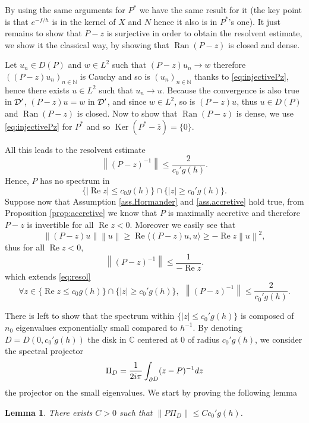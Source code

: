 \documentclass[12pt]{amsart}
\renewcommand{\Re}{\operatorname{Re}}
\newcommand{\C}{\mathbb C}
\newcommand{\N}{\mathbb N}
\newcommand{\Ran}{\operatorname{Ran}}
\newcommand{\Ker}{\operatorname{Ker}}
\def\<{\langle}
\def\>{\rangle}
\numberwithin{equation}{section}
\numberwithin{figure}{section}
\DeclareMathOperator{\p}{\partial}
\newcommand{\vvert}[1]{\left\lVert#1\right\rVert}
\newtheorem{lemma}[defin]{Lemma}
\begin{document}
By using the same arguments for $P^*$ we have the same result for it (the key point is that $e^{-f/h}$ is in the kernel of $X$ and $N$ hence it also is in $P^*$'s one). It just remains to show that $P-z$ is surjective in order to obtain the resolvent estimate, we show it the classical way, by showing that $\Ran(P-z)$ is closed and dense.

Let $u_n\in D(P)$ and $w\in L^2$ such that $(P-z)u_n\to w$ therefore $((P-z)u_n)_{n\in\N}$ is Cauchy and so is $(u_n)_{n\in\N}$ thanks to \eqref{eq:injectivePz}, hence there exists $u\in L^2$ such that $u_n\to u$. Because the convergence is also true in ${\mathcal D}'$, $(P-z)u = w$ in ${\mathcal D}'$, and since $w\in L^2$, so is $(P-z)u$, thus $u\in D(P)$ and $\Ran(P-z)$ is closed. Now to show that $\Ran(P-z)$ is dense, we use \eqref{eq:injectivePz} for $P^*$ and so $\Ker(P^*-\overline{z})=\{0\}$.

All this leads to the resolvent estimate
\begin{equation}\label{eq:resol}
\vvert{(P-z)^{-1}}\leq\frac{2}{c_0'g(h)}.
\end{equation}
Hence, $P$ has no spectrum in
\begin{equation*}
\{|\Re z|\leq c_0g(h)\}\cap\{|z|\geq c_0'g(h)\}.
\end{equation*}
Suppose now that Assumption \ref{ass.Hormander} and \ref{ass.accretive} hold true, from Proposition \ref{prop:accretive} we know that $P$ is maximally accretive and therefore $P - z$ is invertible for all $\Re z < 0$. Moreover we easily see that
\begin{equation*}
\vvert{(P-z)u}\vvert{u} \geq \Re \<(P-z)u,u\> \geq -\Re z\vvert{u}^2,
\end{equation*}
thus for all $\Re z < 0$,
\begin{equation*}
\vvert{(P-z)^{-1}} \leq \frac{1}{-\Re z}.
\end{equation*}
which extends \eqref{eq:resol}
\begin{equation*}
\forall z\in\{\Re z\leq c_0g(h)\}\cap\{|z|\geq c_0'g(h)\},\ \ \vvert{(P-z)^{-1}}\leq\frac{2}{c_0'g(h)}.
\end{equation*}

There is left to show that the spectrum within $\{|z|\leq c_0'g(h)\}$ is composed of $n_0$ eigenvalues exponentially small compared to $h^{-1}$. By denoting $D =D(0,c_0' g(h))$ the disk in $\C$ centered at $0$ of radius $c_0' g(h)$, we consider the spectral projector
\begin{equation*}
\Pi_D=\frac{1}{2i\pi}\int_{\p\negthinspace D}(z-P)^{-1}dz
\end{equation*}
the projector on the small eigenvalues. We start by proving the following lemma
\begin{lemma}\label{lem:Pi_0}
There exists $C>0$ such that $\vvert{P\Pi_D}\leq Cc_0'g(h)$.
\end{lemma}
\end{document}
